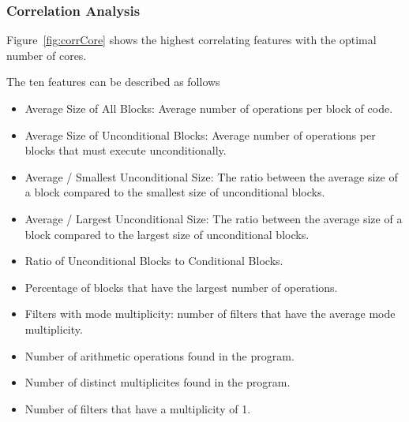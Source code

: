 \subsubsection{Correlation Analysis}

Figure~\ref{fig:corrCore} shows the highest correlating features with the optimal number of cores.

The ten features can be described as follows
\begin{itemize}
\item Average Size of All Blocks: Average number of operations per block of code.
\vspace{-1em}
\item Average Size of Unconditional Blocks: Average number of operations per blocks that must execute unconditionally.
\vspace{-1em}
\item Average / Smallest Unconditional Size: The ratio between the average size of a block compared to the smallest size of unconditional blocks.
\vspace{-1em}
\item Average / Largest Unconditional Size: The ratio between the average size of a block compared to the largest size of unconditional blocks.
\vspace{-1em}
\item Ratio of Unconditional Blocks to Conditional Blocks.
\vspace{-1em}
\item Percentage of blocks that have the largest number of operations.
\vspace{-1em}
\item Filters with mode multiplicity: number of filters that have the average mode multiplicity.
\vspace{-1em}
\item Number of arithmetic operations found in the program.
\vspace{-1em}
\item Number of distinct multiplicites found in the program.
\vspace{-1em}
\item Number of filters that have a multiplicity of 1.
\end{itemize}


